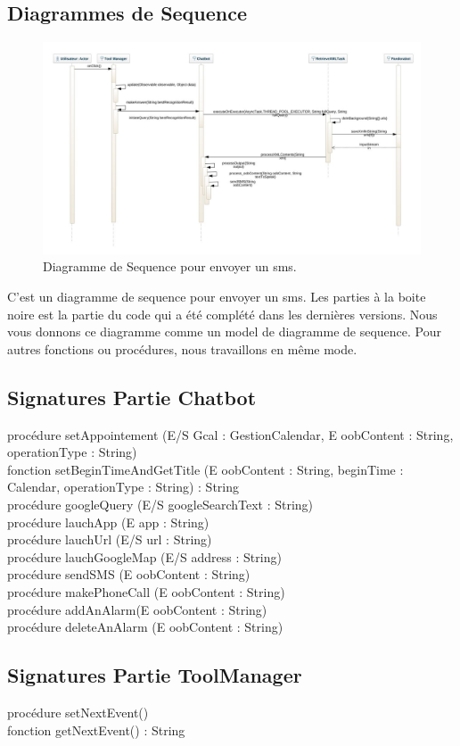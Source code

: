 \subsection{Diagrammes de Sequence}
\begin{figure}[h]
\centering
\includegraphics[scale=0.5]{./diagrammes/Sequence_diagramme_envoyer_un_sms.jpeg}
\caption{Diagramme de Sequence pour envoyer un sms.\label{fig3}}
\end{figure}
\indent C'est un diagramme de sequence pour envoyer un sms. Les parties à la boite noire est la partie du code qui a été complété dans les dernières versions. Nous vous donnons ce diagramme comme un model de diagramme de sequence. Pour autres fonctions ou procédures, nous travaillons en même mode.
\newpage


\subsection{Signatures Partie Chatbot}
procédure setAppointement (E/S Gcal : GestionCalendar, E oobContent : String, operationType : String)\\
\indent fonction setBeginTimeAndGetTitle (E oobContent : String, beginTime : Calendar, operationType : String) : String\\
\indent procédure googleQuery (E/S googleSearchText : String)\\
\indent procédure lauchApp (E app : String)\\
\indent procédure lauchUrl (E/S url : String)\\
\indent procédure lauchGoogleMap (E/S address : String)\\
\indent procédure sendSMS (E oobContent : String)\\
\indent procédure makePhoneCall (E oobContent : String)\\
\indent procédure addAnAlarm(E oobContent : String)\\
\indent procédure deleteAnAlarm (E oobContent : String)\\

\subsection{Signatures Partie ToolManager}
procédure setNextEvent()\\
\indent fonction getNextEvent() : String\\
\newpage

